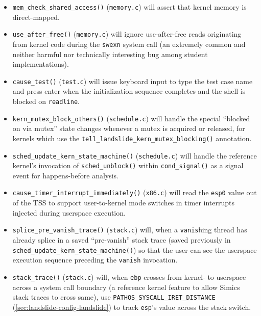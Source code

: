 \begin{itemize}
	\item {\tt mem\_check\_shared\_access()} ({\tt memory.c})
		will assert that kernel memory is direct-mapped.
	\item {\tt use\_after\_free()} ({\tt memory.c})
		will ignore use-after-free reads originating from kernel code during the {\tt swexn} system call
		(an extremely common and neither harmful nor technically interesting bug among student implementations).
	\item {\tt cause\_test()} ({\tt test.c})
		will issue keyboard input to type the test case name and press enter
		when the initialization sequence completes and the shell is blocked on {\tt readline}.
	\item {\tt kern\_mutex\_block\_others()} ({\tt schedule.c})
		will handle the special ``blocked on via mutex'' state changes
		whenever a mutex is acquired or released,
		for kernels which use the {\tt tell\_landslide\_kern\_mutex\_blocking()} annotation.
	\item {\tt sched\_update\_kern\_state\_machine()} ({\tt schedule.c})
		will handle the reference kernel's invocation of {\tt sched\_unblock()} within {\tt cond\_\allowbreak{}signal()}
		as a signal event for happens-before analysis.
	\item {\tt cause\_timer\_interrupt\_immediately()} ({\tt x86.c})
		will read the {\tt esp0} value out of the TSS to support user-to-kernel mode switches
		in timer interrupts injected during userspace execution.
	\item {\tt splice\_pre\_vanish\_trace()} ({\tt stack.c})
		will, when a {\tt vanish}ing thread has already
		splice in a saved ``pre-vanish'' stack trace
		(saved previously in {\tt sched\_update\_kern\_state\_machine()})
		so that the user can see the userspace execution sequence preceding the {\tt vanish} invocation.
	\item {\tt stack\_trace()} ({\tt stack.c})
		will, when {\tt ebp} crosses from kernel- to userspace across a system call boundary
		(a reference kernel feature to allow Simics stack traces to cross same),
		use {\tt PATHOS\_SYSCALL\_IRET\_DISTANCE} (\cref{sec:landslide-config-landslide})
		to track {\tt esp}'s value across the stack switch.
\end{itemize}


